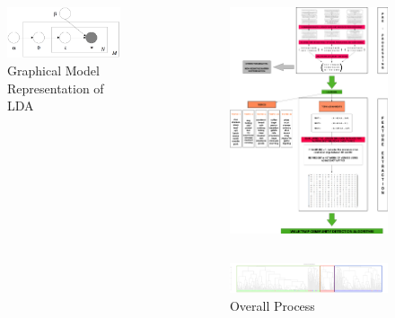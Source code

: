 \documentclass[final]{beamer}
\newlength{\sepwid}
\newlength{\onecolwid}
\newlength{\twocolwid}
\begin{document}
\begin{frame}[t]
\begin{columns}[t]
\begin{column}{\onecolwid}
\begin{figure}
\includegraphics[width=0.5\linewidth]{LDA.png}
\caption{Graphical Model Representation of LDA}
\end{figure}


\end{column} %

\begin{column}{\sepwid}\end{column} %

\begin{column}{\twocolwid} %
\begin{figure}
\includegraphics[width=0.6\linewidth]{posterpicture3.jpg}
\end{figure}

\begin{column}{\twocolwid} %
\begin{figure}
\includegraphics[width=1\linewidth]{dendo_3-1.png}
\caption{Overall Process}
\end{figure}


\end{column}
\end{column}
\end{columns}
\end{frame}
\end{document}
